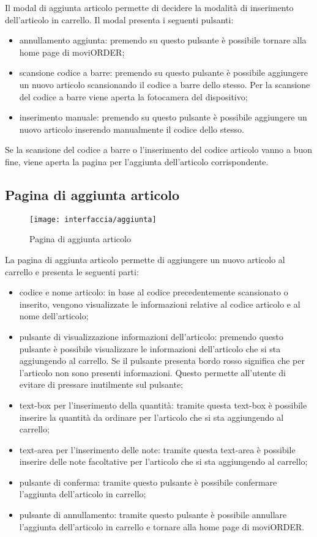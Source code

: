 Il modal di aggiunta articolo permette di decidere la modalità di inserimento dell'articolo in carrello. Il modal presenta i seguenti pulsanti:
\begin{itemize}
	\item annullamento aggiunta: premendo su questo pulsante è possibile tornare alla home page di moviORDER;
	\item scansione codice a barre: premendo su questo pulsante è possibile aggiungere un nuovo articolo scansionando il codice a barre dello stesso. Per la scansione del codice a barre viene aperta la fotocamera del dispositivo;
	\item inserimento manuale: premendo su questo pulsante è possibile aggiungere un nuovo articolo inserendo manualmente il codice dello stesso.
\end{itemize}
Se la scansione del codice a barre o l'inserimento del codice articolo vanno a buon fine, viene aperta la pagina per l'aggiunta dell'articolo corrispondente.

\subsection{Pagina di aggiunta articolo}

\begin{figure}[!h] 
    \centering 
    \texttt{[image: interfaccia/aggiunta]} 
    \caption{Pagina di aggiunta articolo}
\end{figure}

La pagina di aggiunta articolo permette di aggiungere un nuovo articolo al carrello e presenta le seguenti parti:
\begin{itemize}
	\item codice e nome articolo: in base al codice precedentemente scansionato o inserito, vengono visualizzate le informazioni relative al codice articolo e al nome dell'articolo;
	\item pulsante di visualizzazione informazioni dell'articolo: premendo questo pulsante è possibile visualizzare le informazioni dell'articolo che si sta aggiungendo al carrello. Se il pulsante presenta bordo rosso significa che per l'articolo non sono presenti informazioni. Questo permette all'utente di evitare di pressare inutilmente sul pulsante;
	\item text-box per l'inserimento della quantità: tramite questa text-box è possibile inserire la quantità da ordinare per l'articolo che si sta aggiungendo al carrello;
	\item text-area per l'inserimento delle note: tramite questa text-area è possibile inserire delle note facoltative per l'articolo che si sta aggiungendo al carrello;
	\item pulsante di conferma: tramite questo pulsante è possibile confermare l'aggiunta dell'articolo in carrello;
	\item pulsante di annullamento: tramite questo pulsante è possibile annullare l'aggiunta dell'articolo in carrello e tornare alla home page di moviORDER.
\end{itemize}

